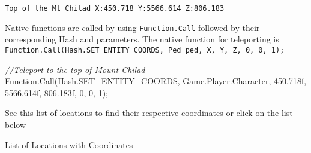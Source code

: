 \documentclass[
  openany]{book}
\newenvironment{Shaded}{\begin{snugshade}}{\end{snugshade}}
\newcommand{\CommentTok}[1]{\textcolor[rgb]{0.56,0.35,0.01}{\textit{#1}}}
\newcommand{\DecValTok}[1]{\textcolor[rgb]{0.00,0.00,0.81}{#1}}
\newcommand{\FloatTok}[1]{\textcolor[rgb]{0.00,0.00,0.81}{#1}}
\newcommand{\FunctionTok}[1]{\textcolor[rgb]{0.00,0.00,0.00}{#1}}
\newcommand{\NormalTok}[1]{#1}
\begin{document}
\texttt{Top\ of\ the\ Mt\ Chilad\ X:450.718\ Y:5566.614\ Z:806.183}

\href{https://nitanmarcel.github.io/shvdn-docs.github.io/namespace_g_t_a_1_1_native.html\#a84977424e1cb7b6f1c2902770bf9ad2d}{Native functions} are called by using \texttt{Function.Call} followed by their corresponding Hash and parameters. The native function for teleporting is \texttt{Function.Call(Hash.SET\_ENTITY\_COORDS,\ Ped\ ped,\ X,\ Y,\ Z,\ 0,\ 0,\ 1);}

\begin{Shaded}
\begin{Highlighting}[]
\CommentTok{//Teleport to the top of Mount Chilad}
\NormalTok{Function.}\FunctionTok{Call}\NormalTok{(Hash.}\FunctionTok{SET_ENTITY_COORDS}\NormalTok{, Game.}\FunctionTok{Player}\NormalTok{.}\FunctionTok{Character}\NormalTok{, }\FloatTok{450.718f}\NormalTok{, }\FloatTok{5566.614f}\NormalTok{, }\FloatTok{806.183f}\NormalTok{, }\DecValTok{0}\NormalTok{, }\DecValTok{0}\NormalTok{, }\DecValTok{1}\NormalTok{);}
\end{Highlighting}
\end{Shaded}

See this \href{https://gtaforums.com/topic/792877-list-of-over-100-coordinates-more-comming/}{list of locations} to find their respective coordinates or click on the list below

List of Locations with Coordinates
\end{document}
